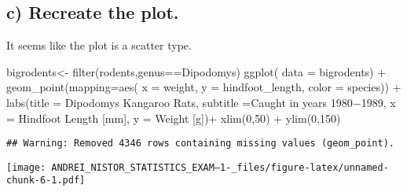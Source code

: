 \documentclass[
]{article}
\newenvironment{Shaded}{\begin{snugshade}}{\end{snugshade}}
\newcommand{\AttributeTok}[1]{\textcolor[rgb]{0.77,0.63,0.00}{#1}}
\newcommand{\DecValTok}[1]{\textcolor[rgb]{0.00,0.00,0.81}{#1}}
\newcommand{\FunctionTok}[1]{\textcolor[rgb]{0.00,0.00,0.00}{#1}}
\newcommand{\NormalTok}[1]{#1}
\newcommand{\OtherTok}[1]{\textcolor[rgb]{0.56,0.35,0.01}{#1}}
\newcommand{\SpecialCharTok}[1]{\textcolor[rgb]{0.00,0.00,0.00}{#1}}
\newcommand{\StringTok}[1]{\textcolor[rgb]{0.31,0.60,0.02}{#1}}
\begin{document}
\hypertarget{c-recreate-the-plot.}{%
\subsection{c) Recreate the plot.}\label{c-recreate-the-plot.}}

It seems like the plot is a scatter type.

\begin{Shaded}
\begin{Highlighting}[]
\NormalTok{bigrodents}\OtherTok{\textless{}{-}} \FunctionTok{filter}\NormalTok{(rodents,genus}\SpecialCharTok{==}\StringTok{\textquotesingle{}Dipodomys\textquotesingle{}}\NormalTok{) }
  \FunctionTok{ggplot}\NormalTok{( }\AttributeTok{data =}\NormalTok{ bigrodents) }\SpecialCharTok{+}
  \FunctionTok{geom\_point}\NormalTok{(}\AttributeTok{mapping=}\FunctionTok{aes}\NormalTok{( }\AttributeTok{x =}\NormalTok{ weight, }\AttributeTok{y =}\NormalTok{ hindfoot\_length, }\AttributeTok{color =}\NormalTok{ species)) }\SpecialCharTok{+}
  \FunctionTok{labs}\NormalTok{(}\AttributeTok{title =} \StringTok{\textquotesingle{}Dipodomys  Kangaroo Rats\textquotesingle{}}\NormalTok{,}
       \AttributeTok{subtitle =}\StringTok{\textquotesingle{}Caught in years 1980−1989\textquotesingle{}}\NormalTok{,}
       \AttributeTok{x =} \StringTok{\textquotesingle{}Hindfoot Length [mm]\textquotesingle{}}\NormalTok{,}
       \AttributeTok{y =} \StringTok{\textquotesingle{}Weight [g]\textquotesingle{}}\NormalTok{)}\SpecialCharTok{+}
  \FunctionTok{xlim}\NormalTok{(}\DecValTok{0}\NormalTok{,}\DecValTok{50}\NormalTok{) }\SpecialCharTok{+} 
  \FunctionTok{ylim}\NormalTok{(}\DecValTok{0}\NormalTok{,}\DecValTok{150}\NormalTok{)}
\end{Highlighting}
\end{Shaded}

\begin{verbatim}
## Warning: Removed 4346 rows containing missing values (geom_point).
\end{verbatim}

\texttt{[image: ANDREI\_NISTOR\_STATISTICS\_EXAM--1-\_files/figure-latex/unnamed-chunk-6-1.pdf]}
\end{document}
